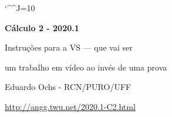 \documentclass[oneside,12pt]{article}
\begin{document}
\catcode`\^^J=10


\long{}
\long{}
\long{}
\long{}
\long{}
\long{}
\long{}
\long{}
\long{}
\long{}

\long{}
\long{}

\def\frown{\ensuremath{{=}{(}}}
\def\True {\mathbf{V}}
\def\False{\mathbf{F}}
\def\D    {\displaystyle}

\def\drafturl{http://angg.twu.net/LATEX/2020-1-C2.pdf}
\def\drafturl{http://angg.twu.net/2020.1-C2.html}
\def\draftfooter{\tiny \href{\drafturl}{\jobname{}} \ColorBrown{\shorttoday{} \hours}}



%

\thispagestyle{empty}

\begin{center}

\vspace*{1.2cm}

{\bf \Large Cálculo 2 - 2020.1}

\bsk

Instruções para a VS --- que vai ser

um trabalho em vídeo ao invés de uma prova

\bsk

Eduardo Ochs - RCN/PURO/UFF

\url{http://angg.twu.net/2020.1-C2.html}

\end{center}
\end{document}
